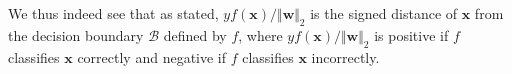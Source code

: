 \documentclass{article}
\numberwithin{equation}{section}
\begin{document}
We thus indeed see that as stated, $ yf(\mathbf{x}) / \Vert\mathbf{w}\Vert_2 $
is the signed distance of $ \mathbf{x} $ from the decision boundary
$ \mathcal{B} $ defined by $ f $, where
$ yf(\mathbf{x}) / \Vert\mathbf{w}\Vert_2 $ is positive if $ f $ classifies
$ \mathbf{x} $ correctly and negative if $ f $ classifies $ \mathbf{x} $
incorrectly.
\end{document}
